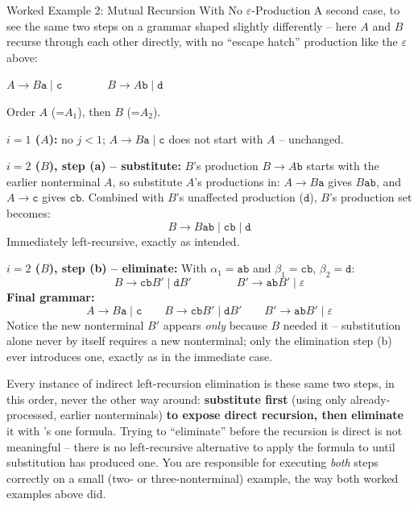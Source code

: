 \documentclass[full-course-notes.tex]{subfiles}
\begin{document}
\begin{examplebox}{Worked Example 2: Mutual Recursion With No $\varepsilon$-Production}
A second case, to see the same two steps on a grammar shaped slightly differently -- here $A$
and $B$ recurse through each other directly, with no ``escape hatch'' production like the
$\varepsilon$ above:
\begin{center}
\ttfamily
$A \to B\texttt{a} \mid \texttt{c} \qquad\qquad B \to A\texttt{b} \mid \texttt{d}$
\end{center}
Order $A$ (=$A_1$), then $B$ (=$A_2$).

\textbf{$i=1$ ($A$):} no $j<1$; $A \to B\texttt{a} \mid \texttt{c}$ does not start with $A$ --
unchanged.

\textbf{$i=2$ ($B$), step (a) -- substitute:} $B$'s production $B \to A\texttt{b}$ starts with
the earlier nonterminal $A$, so substitute $A$'s productions in: $A \to B\texttt{a}$ gives
$B\texttt{a}\texttt{b}$, and $A \to \texttt{c}$ gives $\texttt{c}\texttt{b}$. Combined with $B$'s
unaffected production ($\texttt{d}$), $B$'s production set becomes:
\[
B \to B\texttt{a}\texttt{b} \mid \texttt{c}\texttt{b} \mid \texttt{d}
\]
Immediately left-recursive, exactly as intended.

\textbf{$i=2$ ($B$), step (b) -- eliminate:} With $\alpha_1 = \texttt{a}\texttt{b}$ and
$\beta_1 = \texttt{c}\texttt{b}$, $\beta_2 = \texttt{d}$:
\[
B \to \texttt{c}\texttt{b}B' \mid \texttt{d}B' \qquad\qquad B' \to \texttt{a}\texttt{b}B' \mid
\varepsilon
\]
\textbf{Final grammar:}
\[
A \to B\texttt{a} \mid \texttt{c} \qquad B \to \texttt{c}\texttt{b}B' \mid \texttt{d}B' \qquad
B' \to \texttt{a}\texttt{b}B' \mid \varepsilon
\]
Notice the new nonterminal $B'$ appears \emph{only} because $B$ needed it -- substitution alone
never by itself requires a new nonterminal; only the elimination step (b) ever introduces one,
exactly as in the immediate case.
\end{examplebox}

\begin{examfocus}
Every instance of indirect left-recursion elimination is these same two steps, in this order,
never the other way around: \textbf{substitute first} (using only already-processed, earlier
nonterminals) \textbf{to expose direct recursion, then eliminate} it with
's one formula. Trying to ``eliminate'' before the
recursion is direct is not meaningful -- there is no left-recursive alternative to apply the
formula to until substitution has produced one. You are responsible for executing \emph{both}
steps correctly on a small (two- or three-nonterminal) example, the way both worked examples
above did.
\end{examfocus}
\end{document}
